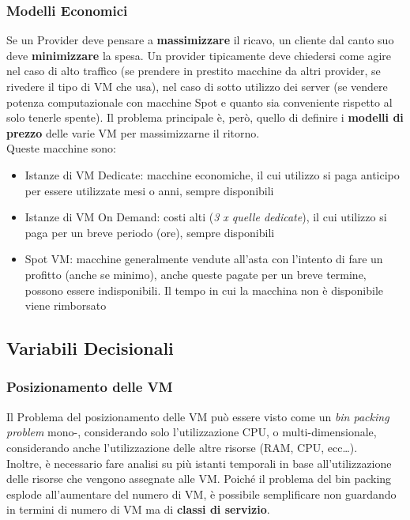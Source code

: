 \documentclass{article}
\providecommand{\tightlist}{%
		  \setlength{\itemsep}{0pt}\setlength{\parskip}{0pt}}
\begin{document}
		\subsubsection{Modelli Economici}\label{modelli-economici}
		Se un Provider deve pensare a \textbf{massimizzare} il ricavo, un cliente dal canto suo deve \textbf{minimizzare} la spesa. Un provider tipicamente deve chiedersi come agire nel caso di alto traffico (se prendere in prestito macchine da altri provider, se rivedere il tipo di VM che usa), nel caso di sotto utilizzo dei server (se vendere potenza computazionale con macchine Spot e quanto sia conveniente rispetto al solo tenerle spente). Il problema principale è, però, quello di definire i \textbf{modelli di prezzo} delle varie VM per massimizzarne il ritorno.\\
		Queste macchine sono:
		
		\begin{itemize}
		\tightlist
		\item
		  Istanze di VM Dedicate: macchine economiche, il cui utilizzo
		  si paga anticipo per essere utilizzate mesi o anni, sempre disponibili
		\item
		  Istanze di VM On Demand: costi alti (\emph{3 x quelle dedicate}), il cui utilizzo si paga per un breve periodo (ore), sempre disponibili
		\item
		  Spot VM: macchine generalmente vendute all'asta con l'intento
		  di fare un profitto (anche se minimo), anche queste pagate per un breve termine, possono essere indisponibili. Il tempo in cui la macchina non è disponibile viene rimborsato
		\end{itemize}
		
		
		\subsection{Variabili Decisionali}\label{variabili-decisionali}
		\subsubsection{Posizionamento delle VM}\label{posizionamento-delle-vm}
		Il Problema del posizionamento delle VM può essere visto come un
		\textit{bin packing problem} mono-, considerando solo l'utilizzazione CPU, o multi-dimensionale, considerando anche l'utilizzazione delle altre risorse (RAM, CPU, ecc\ldots).\\
		
		Inoltre, è necessario fare analisi su più istanti temporali in base all'utilizzazione delle risorse che vengono assegnate alle VM. Poiché il problema del bin packing esplode all'aumentare del numero di VM, è possibile semplificare non guardando in termini di numero di VM ma di \textbf{classi di servizio}.\\
		
\end{document}
